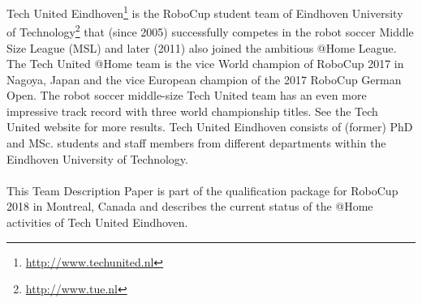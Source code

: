 Tech United Eindhoven\footnote{\url{http://www.techunited.nl}} is the RoboCup student team of Eindhoven University of Technology\footnote{\url{http://www.tue.nl}} that (since 2005) successfully competes in the robot soccer Middle Size League (MSL) and later (2011) also joined the ambitious @Home League. The Tech United @Home team is the vice World champion of RoboCup 2017 in Nagoya, Japan and the vice European champion of the 2017 RoboCup German Open. The robot soccer middle-size Tech United team has an even more impressive track record with three world championship titles. See the Tech United website for more results. Tech United Eindhoven consists of (former) PhD and MSc. students and staff members from different departments within the Eindhoven University of Technology.
\\\\
This Team Description Paper is part of the qualification package for RoboCup 2018 in Montreal, Canada and describes the current status of the @Home activities of Tech United Eindhoven. 